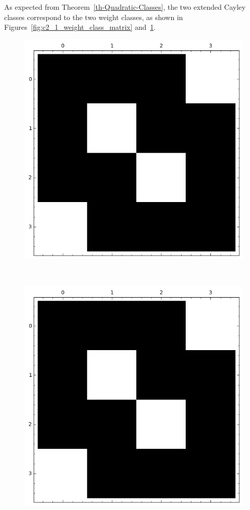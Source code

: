 \documentclass[12pt,a4paper]{article}
\begin{document}
As expected from Theorem~\ref{th-Quadratic-Classes},
the two extended Cayley classes correspond to the two weight classes,
as shown in Figures~\ref{fig:c2_1_weight_class_matrix} and~\ref{fig:c2_1_bent_cayley_graph_index_matrix}.
\begin{figure}[!ht]
\centering
\begin{minipage}{.48\textwidth}
  \centering
  \includegraphics[width=.9\linewidth]{../matrix_plot/re2_1_weight_class_matrix.png}
  \label{fig:c2_1_weight_class_matrix}
\end{minipage}%
~~~~
\begin{minipage}{.48\textwidth}
  \centering
  \includegraphics[width=.9\linewidth]{../matrix_plot/re2_1_bent_cayley_graph_index_matrix.png}
  \label{fig:c2_1_bent_cayley_graph_index_matrix}
\end{minipage}
\end{figure}
\end{document}
